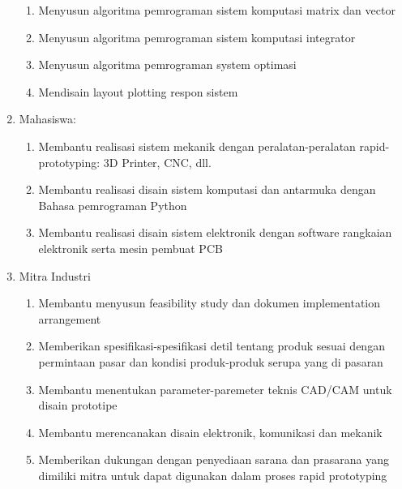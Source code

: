 \begin{enumerate}
          \begin{enumerate}
              \item Menyusun algoritma pemrograman sistem komputasi matrix dan vector
              \item Menyusun algoritma pemrograman sistem komputasi integrator
              \item Menyusun algoritma pemrograman system optimasi
              \item Mendisain layout plotting respon sistem
          \end{enumerate}
    \item Mahasiswa:
          \begin{enumerate}
              \item Membantu realisasi sistem mekanik dengan peralatan-peralatan rapid-prototyping: 3D Printer, CNC, dll.
              \item Membantu realisasi disain sistem komputasi dan antarmuka dengan Bahasa pemrograman Python
              \item Membantu realisasi disain sistem elektronik dengan software rangkaian elektronik serta mesin pembuat PCB
          \end{enumerate}
    \item Mitra Industri
          \begin{enumerate}
              \item Membantu menyusun feasibility study dan dokumen implementation arrangement
              \item Memberikan spesifikasi-spesifikasi detil tentang produk sesuai dengan permintaan pasar dan kondisi produk-produk serupa yang di pasaran
              \item Membantu menentukan parameter-paremeter teknis CAD/CAM untuk disain prototipe
              \item Membantu merencanakan disain elektronik, komunikasi dan mekanik
              \item Memberikan dukungan dengan penyediaan sarana dan prasarana yang dimiliki mitra untuk dapat digunakan dalam proses rapid prototyping
          \end{enumerate}
\end{enumerate}




